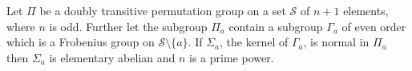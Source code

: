 Let $\Pi$ be a doubly transitive permutation group on a set $\mathcal{S}$ of $n+1$ elements, where $n$ is odd. Further let the subgroup $\Pi_a$ contain a subgroup $\Gamma_a$ of even order which is a Frobenius group on $\mathcal{S} \setminus \{a\}$. If $\Sigma_a$, the kernel of $\Gamma_a$, is normal in $\Pi_a$ then $\Sigma_a$ is elementary abelian and $n$ is a prime power.
